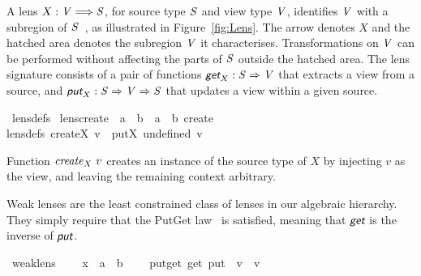 \begin{isabellebody}
\begin{isamarkuptext}
  A lens $X : \mathit{V} \Longrightarrow \mathit{S}$, for source type $\mathit{S}$ and view type $\mathit{V}$, identifies 
  $\mathit{V}$ with a subregion of $\mathit{S}$~\cite{Foster07,Foster09}, as illustrated in Figure~\ref{fig:Lens}. The arrow denotes 
  $X$ and the hatched area denotes the subregion $\mathit{V}$ it characterises. Transformations on 
  $\mathit{V}$ can be performed without affecting the parts of $\mathit{S}$ outside the hatched area. The lens 
  signature consists of a pair of functions $\textit{\textsf{get}}_X : \mathit{S} \Rightarrow \mathit{V}$ that extracts a view 
  from a source, and $\textit{\textsf{put}}_X : \mathit{S} \Rightarrow \mathit{V} \Rightarrow \mathit{S}$ that updates a view within 
  a given source.%
\end{isamarkuptext}\isamarkuptrue%
\isamarkupfalse%
\ lens{\isacharunderscore}defs\isanewline
\isanewline
{}\isamarkupfalse%
\ lens{\isacharunderscore}create\ {\isacharcolon}{\isacharcolon}\ {\isachardoublequoteopen}{\isacharparenleft}{\isacharprime}a\ {\isasymLongrightarrow}\ {\isacharprime}b{\isacharparenright}\ {\isasymRightarrow}\ {\isacharprime}a\ {\isasymRightarrow}\ {\isacharprime}b{\isachardoublequoteclose}\ {\isacharparenleft}{\isachardoublequoteopen}create{\isasymindex}{\isachardoublequoteclose}{\isacharparenright}\ \isanewline
{\isacharbrackleft}lens{\isacharunderscore}defs{\isacharbrackright}{\isacharcolon}\ {\isachardoublequoteopen}create\isactrlbsub X\isactrlesub \ v\ {\isacharequal}\ put\isactrlbsub X\isactrlesub \ undefined\ v{\isachardoublequoteclose}%
\begin{isamarkuptext}%
Function $\mathit{create}_X~v$ creates an instance of the source type of $X$ by injecting $v$
  as the view, and leaving the remaining context arbitrary.%
\end{isamarkuptext}\isamarkuptrue%
%
\isamarkuptrue%
%
\begin{isamarkuptext}%
Weak lenses are the least constrained class of lenses in our algebraic hierarchy. They
  simply require that the PutGet law~\cite{Foster09,Fischer2015} is satisfied, meaning that 
  $\textit{\textsf{get}}$ is the inverse of $\textit{\textsf{put}}$.%
\end{isamarkuptext}\isamarkuptrue%
\isamarkupfalse%
\ weak{\isacharunderscore}lens\ {\isacharequal}\isanewline
\ \ \ x\ {\isacharcolon}{\isacharcolon}\ {\isachardoublequoteopen}{\isacharprime}a\ {\isasymLongrightarrow}\ {\isacharprime}b{\isachardoublequoteclose}\ {\isacharparenleft}\isanewline
\ \ \ put{\isacharunderscore}get{\isacharcolon}\ {\isachardoublequoteopen}get\ {\isacharparenleft}put\ {\isasymsigma}\ v{\isacharparenright}\ {\isacharequal}\ v{\isachardoublequoteclose}\isanewline

\end{isabellebody}
